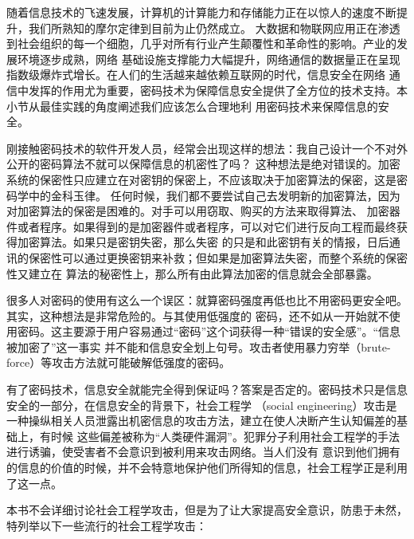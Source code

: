 
\startsection[title={密码与信息安全常识}]

随着信息技术的飞速发展，计算机的计算能力和存储能力正在以惊人的速度不断提升，我们所熟知的摩尔定律到目前为止仍然成立。
大数据和物联网应用正在渗透到社会组织的每一个细胞，几乎对所有行业产生颠覆性和革命性的影响。产业的发展环境逐步成熟，网络
基础设施支撑能力大幅提升，网络通信的数据量正在呈现指数级爆炸式增长。在人们的生活越来越依赖互联网的时代，信息安全在网络
通信中发挥的作用尤为重要，密码技术为保障信息安全提供了全方位的技术支持。本小节从最佳实践的角度阐述我们应该怎么合理地利
用密码技术来保障信息的安全。

\startsubsection[title={任何时候不要尝试发明新的加密算法}]

刚接触密码技术的软件开发人员，经常会出现这样的想法：我自己设计一个不对外公开的密码算法不就可以保障信息的机密性了吗？
这种想法是绝对错误的。加密系统的保密性只应建立在对密钥的保密上，不应该取决于加密算法的保密，这是密码学中的金科玉律。
任何时候，我们都不要尝试自己去发明新的加密算法，因为对加密算法的保密是困难的。对手可以用窃取、购买的方法来取得算法、
加密器件或者程序。如果得到的是加密器件或者程序，可以对它们进行反向工程而最终获得加密算法。如果只是密钥失密，那么失密
的只是和此密钥有关的情报，日后通讯的保密性可以通过更换密钥来补救；但如果是加密算法失密，而整个系统的保密性又建立在
算法的秘密性上，那么所有由此算法加密的信息就会全部暴露。

\startsubsection[title={不要使用低强度的密码}]

很多人对密码的使用有这么一个误区：就算密码强度再低也比不用密码更安全吧。其实，这种想法是非常危险的。与其使用低强度的
密码，还不如从一开始就不使用密码。这主要源于用户容易通过“密码”这个词获得一种“错误的安全感”。“信息被加密了”这一事实
并不能和信息安全划上句号。攻击者使用暴力穷举（brute-force）等攻击方法就可能破解低强度的密码。

\startsubsection[title={信息安全也是一门社会性课题}]

有了密码技术，信息安全就能完全得到保证吗？答案是否定的。密码技术只是信息安全的一部分，在信息安全的背景下，社会工程学 
（social engineering）攻击是一种操纵相关人员泄露出机密信息的攻击方法，建立在使人决断产生认知偏差的基础上，有时候
这些偏差被称为“人类硬件漏洞”。犯罪分子利用社会工程学的手法进行诱骗，使受害者不会意识到被利用来攻击网络。当人们没有
意识到他们拥有的信息的价值的时候，并不会特意地保护他们所得知的信息，社会工程学正是利用了这一点。

本书不会详细讨论社会工程学攻击，但是为了让大家提高安全意识，防患于未然，特列举以下一些流行的社会工程学攻击：

